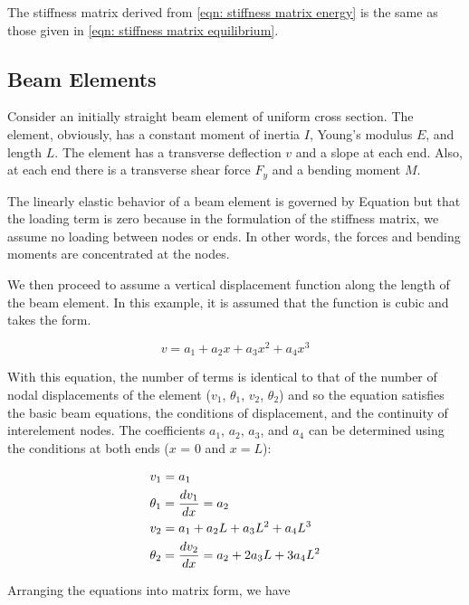 \documentclass[a4paper,openany,nobib]{tufte-book}
\begin{document}
{{The stiffness matrix derived from \ref{eqn: stiffness matrix energy} is the same as those given in \ref{eqn: stiffness matrix equilibrium}.

\subsection{Beam Elements}
\label{beam-elements}
Consider an initially straight beam element of uniform cross section.
The element, obviously, has a constant moment of inertia \(I\), Young's
modulus \(E\), and length \(L\). The element has a transverse deflection \(v\)
and a slope at each end. Also, at each end there is a transverse shear
force \(F_y\) and a bending moment \(M\).

The linearly elastic behavior of a beam element is governed by Equation
but that the loading term is zero because in the formulation of the
stiffness matrix, we assume no loading between nodes or ends. In other
words, the forces and bending moments are concentrated at the nodes.

We then proceed to assume a vertical displacement function along the
length of the beam element. In this example, it is assumed that the
function is cubic and takes the form.

$$ v = a_1 + a_2x + a_3x^2 + a_4x^3$$

With this equation, the number of terms is identical to that of the
number of nodal displacements of the element (\(v_1\), \(\theta_1\), \(v_2\),
\(\theta_2\)) and so the equation satisfies the basic beam equations, the
conditions of displacement, and the continuity of interelement nodes.
The coefficients \(a_1\), \(a_2\), \(a_3\), and \(a_4\) can be determined using
the conditions at both ends (\(x\) = 0 and \(x = L\)):

\begin{gather*}
  v_1 = a_1 \hfill \\
  \theta _1 = \frac{dv_1}{dx} = a_2 \hfill \\
  v_2 = a_1 + a_2L + a_3L^2 + a_4L^3 \hfill \\
  \theta_2 = \frac{dv_2}{dx} = a_2 + 2a_3L + 3a_4L^2 \hfill \\ 
\end{gather*}

Arranging the equations into matrix form, we have

}}
\end{document}
